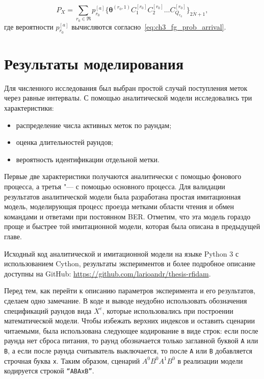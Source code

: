 $$
	P_X = \sum\limits_{r_0 \in \mathfrak{R}} p_{r_0}^{[a]} \{ \bm{\theta}^{(r_0,1)} C_1^{[r_0]} C_2^{[r_0]} \dots C_{Q_{r_0}}^{[r_0]} \}_{2\overline{N}+1},
$$
где вероятности $p_{r_0}^{[a]}$ вычисляются согласно~\eqref{eq:ch3_fg_prob_arrival}.






\section{Результаты моделирования}
Для численного исследования был выбран простой случай поступления меток через равные интервалы. С помощью аналитической модели исследовались три характеристики:

\begin{itemize}
	\item{распределение числа активных меток по раундам;}
	\item{оценка длительностей раундов;}
	\item{вероятность идентификации отдельной метки.}
\end{itemize}
Первые две характеристики получаются аналитически с помощью фонового процесса, а третья "--- с помощью основного процесса. Для валидации результатов аналитической модели была разработана простая имитационная модель, моделирующая процесс проезда метками области чтения и обмен командами и ответами при постоянном BER. Отметим, что эта модель гораздо проще и быстрее той имитационной модели, которая была описана в предыдущей главе.

Исходный код аналитической и имитационной модели на языке Python 3 с использованием Cython, результаты экспериментов и более подробное описание доступны на GitHub: \url{https://github.com/larioandr/thesis-rfidam}.

Перед тем, как перейти к описанию параметров эксперимента и его результатов, сделаем одно замечание. В коде и выводе неудобно использовать обозначения спецификаций раундов вида $X^e$, которые использовались при построении математической модели. Чтобы избежать верхних индексов и оставить сценарии читаемыми, была использована следующее кодирование в виде строк: если после раунда нет сброса питания, то раунд обозначается только заглавной буквой \texttt{A} или \texttt{B}, а если после раунда считыватель выключается, то после \texttt{A} или \texttt{B} добавляется строчная буква \texttt{x}. Таким образом, сценарий $A^0B^0A^1B^0$ в реализации модели кодируется строкой \texttt{``ABAxB''}.

